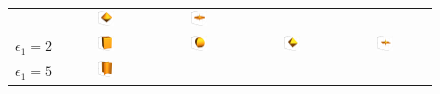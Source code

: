 \begin{figure}[htb]
\begin{tabular}{ccccc}
    & \includegraphics[width=0.2\textwidth]{../images/form_factor/supershapes/superquadric111_1_2.png}
    & \includegraphics[width=0.2\textwidth]{../images/form_factor/supershapes/superquadric111_1_5.png} \\
  $\epsilon_1=2$
    & \includegraphics[width=0.2\textwidth]{../images/form_factor/supershapes/superquadric111_2_01.png}
    & \includegraphics[width=0.2\textwidth]{../images/form_factor/supershapes/superquadric111_2_1.png}
    & \includegraphics[width=0.2\textwidth]{../images/form_factor/supershapes/superquadric111_2_2.png}
    & \includegraphics[width=0.2\textwidth]{../images/form_factor/supershapes/superquadric111_2_5.png} \\
  $\epsilon_1=5$
    & \includegraphics[width=0.2\textwidth]{../images/form_factor/supershapes/superquadric111_5_01.png}

\end{tabular}
\end{figure}
